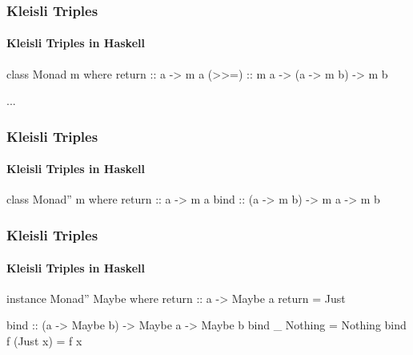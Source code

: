 \documentclass{beamer}
\begin{document}

\begin{frame}[fragile]
  \frametitle{Kleisli Triples}
  \framesubtitle{Kleisli Triples in Haskell}

  \begin{definition}
    \begin{code}
class Monad m where
  return :: a -> m a
  (>>=)  :: m a -> (a -> m b) -> m b

  ...
    \end{code}
  \end{definition}

\end{frame}


\begin{frame}[fragile]
  \frametitle{Kleisli Triples}
  \framesubtitle{Kleisli Triples in Haskell}

  \begin{definition}
    \begin{code}
class Monad'' m where
  return :: a -> m a
  bind   :: (a -> m b) -> m a -> m b
    \end{code}
  \end{definition}

\end{frame}


\begin{frame}[fragile]
  \frametitle{Kleisli Triples}
  \framesubtitle{Kleisli Triples in Haskell}

  \begin{example}
    \begin{code}
instance Monad'' Maybe where
  return :: a -> Maybe a
  return = Just

  bind :: (a -> Maybe b) -> Maybe a -> Maybe b
  bind _ Nothing  = Nothing
  bind f (Just x) = f x
    \end{code}
  \end{example}

\end{frame}

\end{document}
